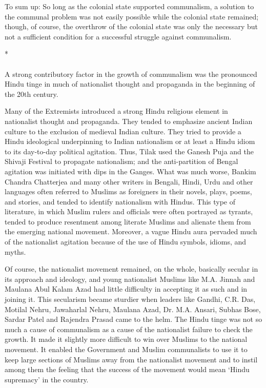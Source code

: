 To sum up: So long as the colonial state supported communalism, a solution to the communal problem was not easily possible while the colonial state remained; though, of course, the overthrow of the colonial state was only the necessary but not a sufficient condition for a successful struggle against communalism.

\begin{center}*\end{center}

\paragraph*{}


A strong contributory factor in the growth of communalism was the pronounced Hindu tinge in much of nationalist thought and propaganda in the beginning of the 20th century. 

Many of the Extremists introduced a strong Hindu religious element in nationalist thought and propaganda. They tended to emphasize ancient Indian culture to the exclusion of medieval Indian culture. They tried to provide a Hindu ideological underpinning to Indian nationalism or at least a Hindu idiom to its day-to-day political agitation. Thus, Tilak used the Ganesh Puja and the Shivaji Festival to propagate nationalism; and the anti-partition of Bengal agitation was initiated with dips in the Ganges. What was much worse, Bankim Chandra Chatterjea and many other writers in Bengali, Hindi, Urdu and other languages often referred to Muslims as foreigners in their novels, plays, poems, and stories, and tended to identify nationalism with Hindus. This type of literature, in which Muslim rulers and officials were often portrayed as tyrants, tended to produce resentment among literate Muslims and alienate them from the emerging national movement. Moreover, a vague Hindu aura pervaded much of the nationalist agitation because of the use of Hindu symbols, idioms, and myths. 

Of course, the nationalist movement remained, on the whole, basically secular in its approach and ideology, and young nationalist Muslims like M.A. Jinnah and Maulana Abul Kalam Azad had little difficulty in accepting it as such and in joining it. This secularism became sturdier when leaders like Gandhi, C.R. Das, Motilal Nehru, Jawaharlal Nehru, Maulana Azad, Dr. M.A. Ansari, Subhas Bose, Sardar Patel and Rajendra Prasad came to the helm. The Hindu tinge was not so much a cause of communalism as a cause of the nationalist failure to check the growth. It made it slightly more difficult to win over Muslims to the national movement. It enabled the Government and Muslim communalists to use it to keep large sections of Muslims away from the nationalist movement and to instil among them the feeling that the success of the movement would mean `Hindu supremacy' in the country. 

